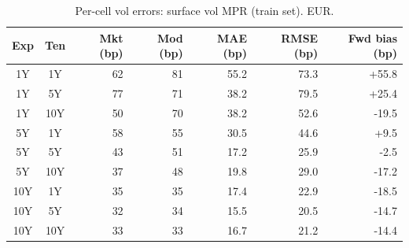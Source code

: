 \begin{table}[H]
\centering
\caption{Per-cell vol errors: surface vol MPR (train set). EUR.}
\label{tab:surface_vol_mpr_per_cell_train}
\small
\begin{tabular}{@{}ccrrrrr@{}}
\toprule
\textbf{Exp} & \textbf{Ten} & \textbf{Mkt (bp)} & \textbf{Mod (bp)} & \textbf{MAE (bp)} & \textbf{RMSE (bp)} & \textbf{Fwd bias (bp)} \\
\midrule
  1Y & 1Y & 62 & 81 & 55.2 & 73.3 & +55.8 \\
  1Y & 5Y & 77 & 71 & 38.2 & 79.5 & +25.4 \\
  1Y & 10Y & 50 & 70 & 38.2 & 52.6 & -19.5 \\
  \midrule
  5Y & 1Y & 58 & 55 & 30.5 & 44.6 & +9.5 \\
  5Y & 5Y & 43 & 51 & 17.2 & 25.9 & -2.5 \\
  5Y & 10Y & 37 & 48 & 19.8 & 29.0 & -17.2 \\
  \midrule
  10Y & 1Y & 35 & 35 & 17.4 & 22.9 & -18.5 \\
  10Y & 5Y & 32 & 34 & 15.5 & 20.5 & -14.7 \\
  10Y & 10Y & 33 & 33 & 16.7 & 21.2 & -14.4 \\
\bottomrule
\end{tabular}
\end{table}